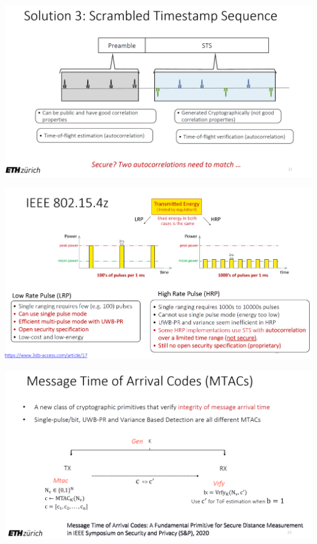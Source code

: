 \begin{minipage}{\linewidth}
    \centering      
    \includegraphics[width=\linewidth]{Figures/L5_sol3.PNG} 
\end{minipage}

\begin{minipage}{\linewidth}
    \centering      
    \includegraphics[width=\linewidth]{Figures/L5_IEEE.PNG} 
\end{minipage}

\begin{minipage}{\linewidth}
    \centering      
    \includegraphics[width=\linewidth]{Figures/L5_MTAC.PNG} 
\end{minipage}

